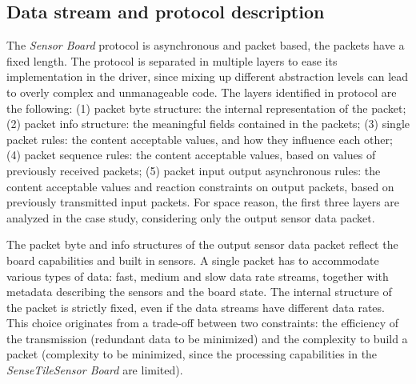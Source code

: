 \documentclass[english]{lni}
\newcommand{\ST}{\emph{SenseTile}\xspace}
\newcommand{\SB}{\emph{Sensor Board}\xspace}
\newcommand{\STSB}{\ST \SB\xspace}
\begin{document}
\subsection{Data stream and protocol description}
\label{subsec:data_stream_and_protocol_description}

The \SB protocol is asynchronous and packet based, the packets have a fixed length.  
The protocol is separated in multiple layers to ease its implementation in the driver, since mixing up different abstraction levels can lead to overly complex and unmanageable code.  
The layers identified in protocol are the following: (1) packet byte structure: the internal representation of the packet; (2) packet info structure: the meaningful fields contained in the packets; (3) single packet rules: the content acceptable values, and how they influence each other; (4) packet sequence rules: the content acceptable values, based on values of previously received packets; (5) packet input output asynchronous rules: the content acceptable values and reaction constraints on output packets, based on previously transmitted input packets.
For space reason, the first three layers are analyzed in the case study, considering only the output sensor data packet.

The packet byte and info structures of the output sensor data packet reflect the board capabilities and built in sensors. 
A single packet has to accommodate various types of data: fast, medium and slow data rate streams, together with metadata describing the sensors and the board state.
The internal structure of the packet is strictly fixed, even if the data streams have different data rates. 
This choice originates from a trade-off between two constraints: the efficiency of the transmission (redundant data to be minimized) and the complexity to build a packet (complexity to be minimized, since the processing capabilities in the \STSB are limited). 
\end{document}
